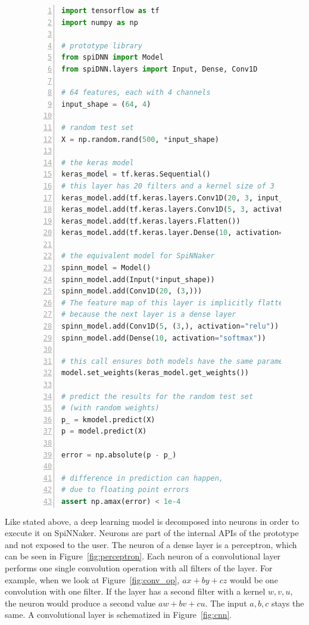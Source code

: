 \documentclass[]{article}
\begin{document}
\begin{figure} %
\begin{lstlisting}[language=Python, caption={Example code comparing
  1D CNNs in Keras to the prototype.}, captionpos=b,
  label=lst:spiDNN_vs_keras_cnns, numbers=left]
import tensorflow as tf
import numpy as np

# prototype library
from spiDNN import Model
from spiDNN.layers import Input, Dense, Conv1D

# 64 features, each with 4 channels
input_shape = (64, 4)

# random test set
X = np.random.rand(500, *input_shape)

# the keras model
keras_model = tf.keras.Sequential()
# this layer has 20 filters and a kernel size of 3
keras_model.add(tf.keras.layers.Conv1D(20, 3, input_shape=input_shape))
keras_model.add(tf.keras.layers.Conv1D(5, 3, activation="relu"))
keras_model.add(tf.keras.layers.Flatten())
keras_model.add(tf.keras.layer.Dense(10, activation="softmax"))

# the equivalent model for SpiNNaker
spinn_model = Model()
spinn_model.add(Input(*input_shape))
spinn_model.add(Conv1D(20, (3,)))
# The feature map of this layer is implicitly flattened,
# because the next layer is a dense layer
spinn_model.add(Conv1D(5, (3,), activation="relu"))
spinn_model.add(Dense(10, activation="softmax"))

# this call ensures both models have the same parameters
model.set_weights(keras_model.get_weights())

# predict the results for the random test set
# (with random weights)
p_ = kmodel.predict(X)
p = model.predict(X)

error = np.absolute(p - p_)

# difference in prediction can happen,
# due to floating point errors
assert np.amax(error) < 1e-4
\end{lstlisting}
\end{figure} %

Like stated above, a deep learning model is decomposed into neurons
in order to execute it on SpiNNaker.
Neurons are part of the internal APIs of the prototype and not exposed
to the user.
The neuron of a dense layer is a perceptron, which can be seen in
Figure~\ref{fig:perceptron}.
Each neuron of a convolutional layer performs one single convolution
operation with all filters of the layer.
For example, when we look at Figure~\ref{fig:conv_op}, $ax + by + cz$
would be one convolution with one filter.
If the layer has a second filter with a kernel $w, v, u$, the neuron
would produce a second value $aw + bv + cu$.
The input $a, b, c$ stays the same.
A convolutional layer is schematized in Figure~\ref{fig:cnn}.
\end{document}
